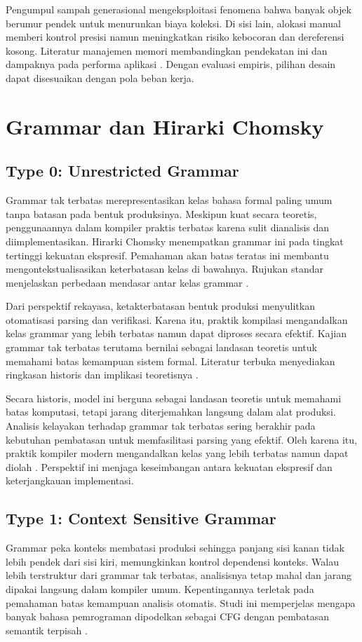 \documentclass[../main.tex]{subfiles}
\begin{document}
Pengumpul sampah generasional mengeksploitasi fenomena bahwa banyak objek berumur pendek untuk menurunkan biaya koleksi. Di sisi lain, alokasi manual memberi kontrol presisi namun meningkatkan risiko kebocoran dan dereferensi kosong. Literatur manajemen memori membandingkan pendekatan ini dan dampaknya pada performa aplikasi \citep{WikiMemory}. Dengan evaluasi empiris, pilihan desain dapat disesuaikan dengan pola beban kerja.

\section{Grammar dan Hirarki Chomsky}
\subsection{Type 0: Unrestricted Grammar}
Grammar tak terbatas merepresentasikan kelas bahasa formal paling umum tanpa batasan pada bentuk produksinya. Meskipun kuat secara teoretis, penggunaannya dalam kompiler praktis terbatas karena sulit dianalisis dan diimplementasikan. Hirarki Chomsky menempatkan grammar ini pada tingkat tertinggi kekuatan ekspresif. Pemahaman akan batas teratas ini membantu mengontekstualisasikan keterbatasan kelas di bawahnya. Rujukan standar menjelaskan perbedaan mendasar antar kelas grammar \citep{WikiChomsky}.

Dari perspektif rekayasa, ketakterbatasan bentuk produksi menyulitkan otomatisasi parsing dan verifikasi. Karena itu, praktik kompilasi mengandalkan kelas grammar yang lebih terbatas namun dapat diproses secara efektif. Kajian grammar tak terbatas terutama bernilai sebagai landasan teoretis untuk memahami batas kemampuan sistem formal. Literatur terbuka menyediakan ringkasan historis dan implikasi teoretisnya \citep{WikiChomsky}.

Secara historis, model ini berguna sebagai landasan teoretis untuk memahami batas komputasi, tetapi jarang diterjemahkan langsung dalam alat produksi. Analisis kelayakan terhadap grammar tak terbatas sering berakhir pada kebutuhan pembatasan untuk memfasilitasi parsing yang efektif. Oleh karena itu, praktik kompiler modern mengandalkan kelas yang lebih terbatas namun dapat diolah \citep{WikiChomsky}. Perspektif ini menjaga keseimbangan antara kekuatan ekspresif dan keterjangkauan implementasi.

\subsection{Type 1: Context Sensitive Grammar}
Grammar peka konteks membatasi produksi sehingga panjang sisi kanan tidak lebih pendek dari sisi kiri, memungkinkan kontrol dependensi konteks. Walau lebih terstruktur dari grammar tak terbatas, analisisnya tetap mahal dan jarang dipakai langsung dalam kompiler umum. Kepentingannya terletak pada pemahaman batas kemampuan analisis otomatis. Studi ini memperjelas mengapa banyak bahasa pemrograman dipodelkan sebagai CFG dengan pembatasan semantik terpisah \citep{WikiChomsky}.
\end{document}
